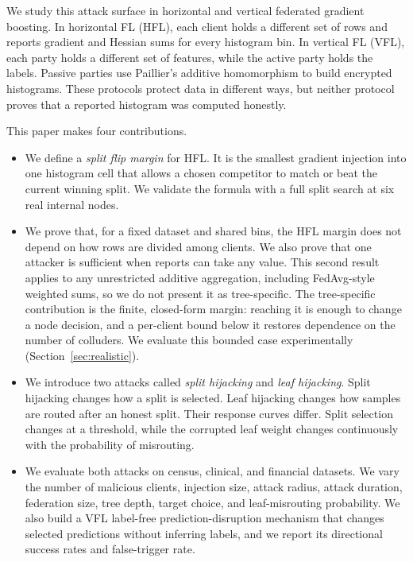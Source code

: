 \documentclass[11pt]{article}
\newcommand{\rev}[1]{{\color{blue}#1}}
\begin{document}
We study this attack surface in horizontal and vertical federated gradient boosting. In horizontal FL (HFL), each client holds a different set of rows and reports gradient and Hessian sums for every histogram bin. In vertical FL (VFL), each party holds a different set of features, while the active party holds the labels. Passive parties use Paillier's additive homomorphism to build encrypted histograms. These protocols protect data in different ways, but neither protocol proves that a reported histogram was computed honestly.

This paper makes four contributions.

\begin{itemize}
  \item We define a \emph{split flip margin} for HFL. It is the smallest gradient injection into one histogram cell that allows a chosen competitor to match or beat the current winning split. We validate the formula with a full split search at six real internal nodes.

  \item We prove that, for a fixed dataset and shared bins, the HFL margin does not depend on how rows are divided among clients. We also prove that one attacker is sufficient when reports can take any value. This second result applies to any unrestricted additive aggregation, including FedAvg-style weighted sums, so we do not present it as tree-specific. \rev{The tree-specific contribution is the finite, closed-form margin: reaching it is enough to change a node decision, and a per-client bound below it restores dependence on the number of colluders. We evaluate this bounded case experimentally (Section~\ref{sec:realistic}).}

  \item We introduce two attacks called \emph{split hijacking} and \emph{leaf hijacking}. Split hijacking changes how a split is selected. Leaf hijacking changes how samples are routed after an honest split. Their response curves differ. Split selection changes at a threshold, while the corrupted leaf weight changes continuously with the probability of misrouting.

  \item We evaluate both attacks on census, clinical, and financial datasets. We vary the number of malicious clients, injection size, attack radius, attack duration, federation size, tree depth, target choice, and leaf-misrouting probability. We also build a VFL \rev{label-free prediction-disruption mechanism} that changes selected predictions without inferring labels\rev{, and we report its directional success rates and false-trigger rate}.
\end{itemize}
\end{document}
